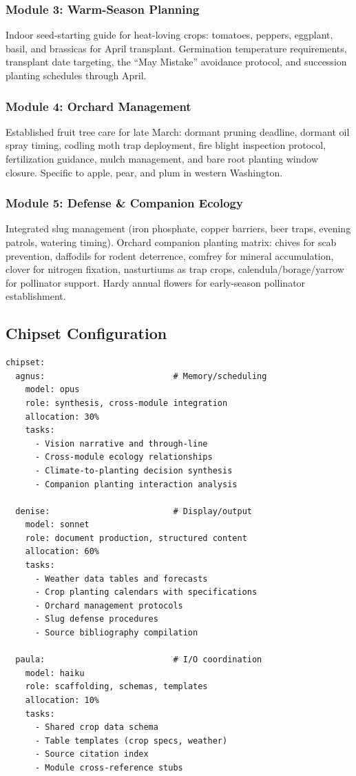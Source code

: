 \documentclass[11pt,letterpaper]{article}
\begin{document}
\subsubsection{Module 3: Warm-Season Planning}
Indoor seed-starting guide for heat-loving crops: tomatoes, peppers, eggplant, basil, and brassicas for April transplant. Germination temperature requirements, transplant date targeting, the ``May Mistake'' avoidance protocol, and succession planting schedules through April.

\subsubsection{Module 4: Orchard Management}
Established fruit tree care for late March: dormant pruning deadline, dormant oil spray timing, codling moth trap deployment, fire blight inspection protocol, fertilization guidance, mulch management, and bare root planting window closure. Specific to apple, pear, and plum in western Washington.

\subsubsection{Module 5: Defense \& Companion Ecology}
Integrated slug management (iron phosphate, copper barriers, beer traps, evening patrols, watering timing). Orchard companion planting matrix: chives for scab prevention, daffodils for rodent deterrence, comfrey for mineral accumulation, clover for nitrogen fixation, nasturtiums as trap crops, calendula/borage/yarrow for pollinator support. Hardy annual flowers for early-season pollinator establishment.

\subsection{Chipset Configuration}

\begin{asciibox}
\begin{verbatim}
chipset:
  agnus:                          # Memory/scheduling
    model: opus
    role: synthesis, cross-module integration
    allocation: 30%
    tasks:
      - Vision narrative and through-line
      - Cross-module ecology relationships
      - Climate-to-planting decision synthesis
      - Companion planting interaction analysis

  denise:                         # Display/output
    model: sonnet
    role: document production, structured content
    allocation: 60%
    tasks:
      - Weather data tables and forecasts
      - Crop planting calendars with specifications
      - Orchard management protocols
      - Slug defense procedures
      - Source bibliography compilation

  paula:                          # I/O coordination
    model: haiku
    role: scaffolding, schemas, templates
    allocation: 10%
    tasks:
      - Shared crop data schema
      - Table templates (crop specs, weather)
      - Source citation index
      - Module cross-reference stubs
\end{verbatim}
\end{asciibox}
\end{document}
